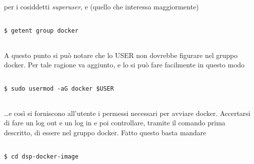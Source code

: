 \documentclass[14pt]{extreport}
\begin{document}
\vspace{18pt}
per i cosiddetti \textit{superuser}, e (quello che interessa maggiormente)

\vspace{10pt}

{
\small
\begin{tcolorbox}

\begin{verbatim}

$ getent group docker
  
\end{verbatim}

\end{tcolorbox}
}

\vspace{18pt}

A questo punto si può notare che lo USER non dovrebbe figurare nel gruppo docker. Per tale ragione va aggiunto, e lo si può fare facilmente in questo modo

\vspace{10pt}

{
\small
\begin{tcolorbox}

\begin{verbatim}

$ sudo usermod -aG docker $USER
  
\end{verbatim}

\end{tcolorbox}
}

\vspace{18pt}

\ldots e così si forniscono all'utente i permessi necessari per avviare docker. Accertarsi di fare un log out e un log in e poi controllare, tramite il comando prima descritto, di essere nel gruppo docker.
Fatto questo basta mandare

\vspace{10pt}

{
\small
\begin{tcolorbox}

\begin{verbatim}

$ cd dsp-docker-image
  
\end{verbatim}

\end{tcolorbox}
}

\vspace{18pt}
\end{document}
